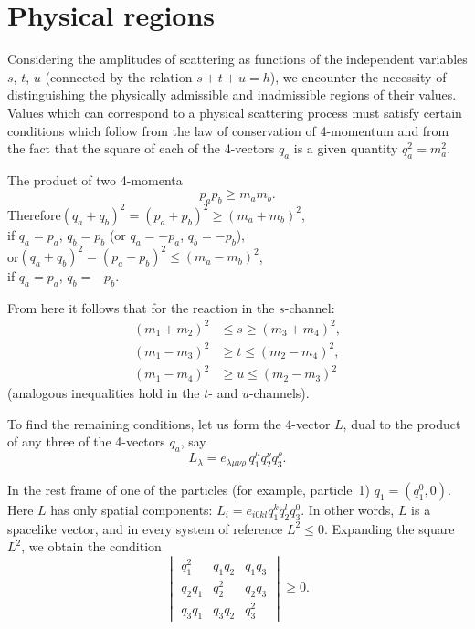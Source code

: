 \section{Physical regions}

Considering the amplitudes of scattering as functions of the independent variables $s$, $t$, $u$ (connected by the relation $s + t + u = h$), we encounter the necessity of distinguishing the physically admissible and inadmissible regions of their values. Values which can correspond to a physical scattering process must satisfy certain conditions which follow from the law of conservation of 4-momentum and from the fact that the square of each of the 4-vectors $q_a$ is a given quantity $q^2_a = m^2_a$.

The product of two 4-momenta
\begin{equation}
p_a p_b \geqslant m_a m_b.
\tag{67.1}
\end{equation}
Therefore\quad $(q_a + q_b)^2 = (p_a + p_b)^2 \geqslant (m_a + m_b)^2$,\\
if $q_a = p_a$, $q_b = p_b$ (or $q_a = -p_a$, $q_b = -p_b$),\\
or\quad $(q_a + q_b)^2 = (p_a - p_b)^2 \leqslant (m_a - m_b)^2$,\\
if $q_a = p_a$, $q_b = -p_b$.

From here it follows that for the reaction in the $s$-channel:
\begin{equation}
\begin{aligned}
(m_1 + m_2)^2 &\leqslant s \geqslant (m_3 + m_4)^2,\\[3pt]
(m_1 - m_3)^2 &\geqslant t \leqslant (m_2 - m_4)^2,\\[3pt]
(m_1 - m_4)^2 &\geqslant u \leqslant (m_2 - m_3)^2
\end{aligned}
\tag{67.2}
\end{equation}
(analogous inequalities hold in the $t$- and $u$-channels).

To find the remaining conditions, let us form the 4-vector $L$, dual to the product of any three of the 4-vectors $q_a$, say
\begin{equation}
L_\lambda = e_{\lambda\mu\nu\rho}\,q^\mu_1 q^\nu_2 q^\rho_3.
\tag{67.3}
\end{equation}

In the rest frame of one of the particles (for example, particle~1) $q_1 = (q^0_1, 0)$. Here $L$ has only spatial components: $L_i = e_{i0kl}q^k_1 q^l_2 q^0_3$. In other words, $L$ is a spacelike vector, and in every system of reference $L^2 \leqslant 0$. Expanding the square $L^2$, we obtain the condition
\begin{equation}
\begin{vmatrix}q^2_1 & q_1 q_2 & q_1 q_3\\ q_2 q_1 & q^2_2 & q_2 q_3\\ q_3 q_1 & q_3 q_2 & q^2_3\end{vmatrix} \geqslant 0.
\tag{67.4}
\end{equation}

